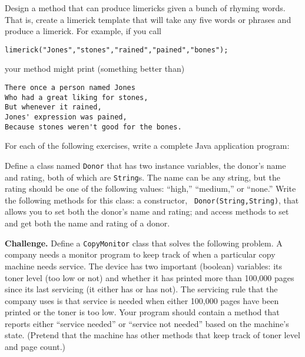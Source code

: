\begin{EXRtwo}
\item  Design a method that can produce limericks given a
bunch of rhyming words. That is, create a limerick template that will
take any five words or phrases and produce a limerick.  For example,
if you call

\begin{jjjlisting}
\begin{lstlisting}
limerick("Jones","stones","rained","pained","bones");
\end{lstlisting}
\end{jjjlisting}

\noindent your method might print (something better than)

\begin{jjjlisting}
\begin{lstlisting}
There once a person named Jones
Who had a great liking for stones,
But whenever it rained,
Jones' expression was pained,
Because stones weren't good for the bones.
\end{lstlisting}
\end{jjjlisting}

\noindent For each of the following exercises, write a complete
Java application program:

\item  Define a class named {\tt Donor} that  has two
instance variables, the donor's name and rating, both of which are
{\tt String}s.  The name can be any string, but the rating should be
one of the following values: ``high,'' ``medium,'' or ``none.''  Write
the following methods for this class: a constructor, {\tt
Donor(String,String)}, that allows you to set both the donor's name
and rating; and access methods to set and get both the name and rating
of a donor.

\item  {\bf Challenge.} Define a {\tt CopyMonitor} class that solves the
following problem.  A company needs a monitor program to keep track of
when a particular copy machine needs service.   The device has two
important (boolean) variables: its toner level (too low or not) and
whether it has printed more than 100,000 pages since its last
servicing (it either has or has not). The servicing rule that the
company uses is that service is needed when either 100,000 pages have
been printed or the toner is too low.  Your program should contain a
method that reports either ``service needed'' or ``service not needed''
based on the machine's state.  (Pretend that the machine has other
methods that keep track of toner level and page count.)


\end{EXRtwo}
